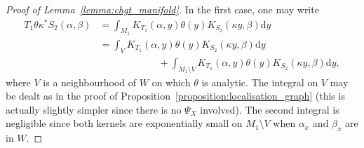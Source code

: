 \documentclass[AHL,Unicode,longabstracts,published]{cedram}
\newcommand{\rmd}{\mathrm{d}}
\begin{document}
\begin{proof}[Proof of Lemma~\ref{lemma:chgt_manifold}]
In the first case, one may write
\begin{equation*}
\begin{split}
T_1 \theta \kappa^* S_2(\alpha,\beta) & = \int_{M_1} K_{T_1}(\alpha,y) \theta(y) K_{S_2}(\kappa y, \beta) \rmd y \\
& = \int_{V} K_{T_1}(\alpha,y) \theta(y) K_{S_2}(\kappa y, \beta) \rmd y \\ & \qquad \qquad \qquad + \int_{M_1 \setminus V} K_{T_1}(\alpha,y) \theta(y) K_{S_2}(\kappa y, \beta) \rmd y,
\end{split}
\end{equation*}
where $V$ is a neighbourhood of $W$ on which $\theta$ is analytic. The integral on $V$ may be dealt as in the proof of Proposition~\ref{proposition:localisation_graph} (this is actually slightly simpler since there is no $\Psi_X$ involved). The second integral is negligible since both kernels are exponentially small on $M_1 \setminus V$ when $\alpha_x$ and $\beta_x$ are in $W$.


\end{proof}
\end{document}
